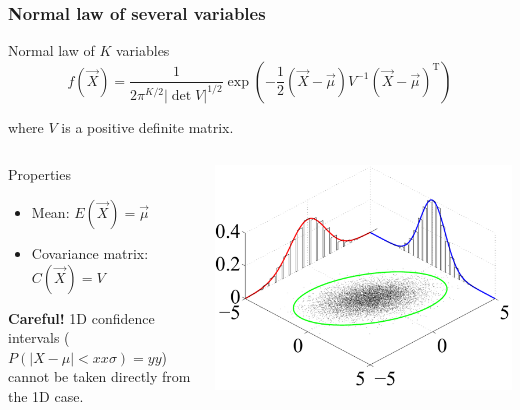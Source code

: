 \documentclass[9pt]{beamer}
\begin{document}
\begin{frame}
 \frametitle{Normal law of several variables}
 
 \begin{block}{Normal law of $K$ variables}
  $$f(\vec{X}) = \frac{1}{2\pi^{K/2} |\det V|^{1/2}} \exp \left( -\frac{1}{2} \left(\vec{X}-\vec{\mu}\right) V^{-1}  \left(\vec{X}-\vec{\mu}\right)^\text{T} \right)$$
  
  where $V$ is a positive definite matrix.
 \end{block}
 
 \begin{columns}
  \begin{column}{0.6\textwidth}
   
 
 \begin{block}{Properties}
  \begin{itemize}
   \item Mean: $E(\vec{X}) = \vec{\mu}$
   \item Covariance matrix: $C(\vec{X}) = V$
  \end{itemize}
 \end{block}
 
  \textbf{Careful!} 1D confidence intervals ($P(|X-\mu|<xx\sigma) = yy$) cannot be taken directly from the 1D case.
  \end{column}
  \begin{column}{0.4\textwidth}
   \includegraphics[width=\textwidth]{../figures/Multivariate_normal_sample.pdf}
  \end{column}

 \end{columns}
 
\end{frame}
\end{document}
